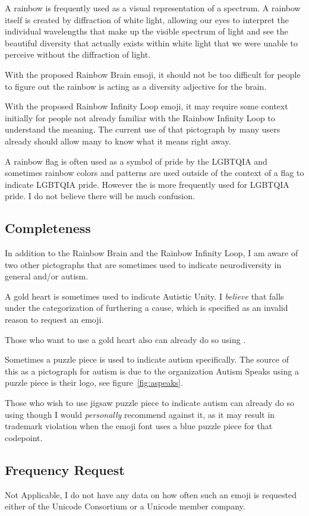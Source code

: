 A rainbow is frequently used as a visual representation of a spectrum. A rainbow itself is
created by diffraction of white light, allowing our eyes to interpret the individual
wavelengths that make up the visible spectrum of light and see the beautiful diversity that
actually exists within white light that we were unable to perceive without the diffraction of
light.

With the proposed Rainbow Brain emoji, it should not be too difficult for people to figure out
the rainbow is acting as a diversity adjective for the brain.

With the proposed Rainbow Infinity Loop emoji, it may require some context initially for people
not already familiar with the Rainbow Infinity Loop to understand the meaning. The current use
of that pictograph by many users already should allow many to know what it means right away.

A rainbow flag is often used as a symbol of pride by the LGBTQIA and sometimes rainbow colors
and patterns are used outside of the context of a flag to indicate LGBTQIA pride. However the
\prideflag{} is more frequently used for
LGBTQIA pride. I do not believe there will be much confusion.

\subsection{Completeness}

In addition to the Rainbow Brain and the Rainbow Infinity Loop, I am aware of two other pictographs
that are sometimes used to indicate neurodiversity in general and/or autism.

A gold heart is sometimes used to indicate Autistic Unity. I \emph{believe} that falls under the
categorization of furthering a cause, which is specified as an invalid reason to request an emoji.

Those who want to use a gold heart also can already do so using \goldheart{}.

Sometimes a puzzle piece is used to indicate autism specifically. The source of this as a pictograph
for autism is due to the organization Autism Speaks using a puzzle piece is their logo, see
figure~\ref{fig:aspeaks}.

Those who wish to use jigsaw puzzle piece to indicate autism can already do so using \jigsawemoji{}
though I would \emph{personally} recommend against it, as it may result in trademark violation when
the emoji font uses a blue puzzle piece for that codepoint.

\subsection{Frequency Request}

Not Applicable, I do not have any data on how often such an emoji is requested either of the
Unicode Consortium or a Unicode member company.
